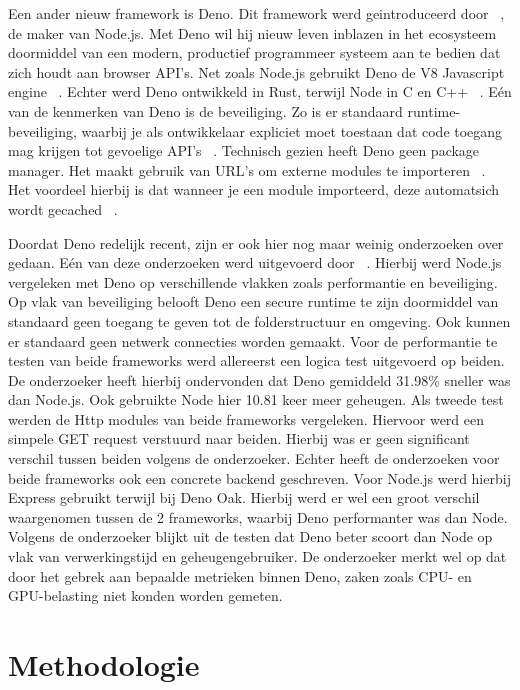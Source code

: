 Een ander nieuw framework is Deno. 
Dit framework werd geintroduceerd door ~\textcite{Dahl2021}, de maker van Node.js.
Met Deno wil hij nieuw leven inblazen in het ecosysteem doormiddel van een modern, productief programmeer systeem aan te bedien dat zich houdt aan browser API's.
Net zoals Node.js gebruikt Deno de V8 Javascript engine ~\autocite{DenoLand2023}. Echter werd Deno ontwikkeld in Rust, terwijl Node in C en C++ ~\autocite{DenoLand2023}. 
Eén van de kenmerken van Deno is de beveiliging. Zo is er standaard runtime-beveiliging, 
waarbij je als ontwikkelaar expliciet moet toestaan dat code toegang mag krijgen tot gevoelige API's ~\autocite{DenoLand2023}.
Technisch gezien heeft Deno geen package manager. Het maakt gebruik van URL's om externe modules te importeren ~\autocite{DenoLand2023}.
Het voordeel hierbij is dat wanneer je een module importeerd, deze automatsich wordt gecached ~\autocite{DenoLand2023}.

Doordat Deno redelijk recent, zijn er ook hier nog maar weinig onderzoeken over gedaan.
Eén van deze onderzoeken werd uitgevoerd door ~\textcite{VanKerkvoorde2021}. 
Hierbij werd Node.js vergeleken met Deno op verschillende vlakken zoals performantie en beveiliging.
Op vlak van beveiliging belooft Deno een secure runtime te zijn doormiddel van standaard geen toegang te geven tot de folderstructuur en omgeving. 
Ook kunnen er standaard geen netwerk connecties worden gemaakt. 
Voor de performantie te testen van beide frameworks werd allereerst een logica test uitgevoerd op beiden. 
De onderzoeker heeft hierbij ondervonden dat Deno gemiddeld 31.98\% sneller was dan Node.js. Ook gebruikte Node hier 10.81 keer meer geheugen.
Als tweede test werden de Http modules van beide frameworks vergeleken. Hiervoor werd een simpele GET request verstuurd naar beiden. 
Hierbij was er geen significant verschil tussen beiden volgens de onderzoeker.
Echter heeft de onderzoeken voor beide frameworks ook een concrete backend geschreven. Voor Node.js werd hierbij Express gebruikt terwijl bij Deno Oak.
Hierbij werd er wel een groot verschil waargenomen tussen de 2 frameworks, waarbij Deno performanter was dan Node.
Volgens de onderzoeker blijkt uit de testen dat Deno beter scoort dan Node op vlak van verwerkingstijd en geheugengebruiker.
De onderzoeker merkt wel op dat door het gebrek aan bepaalde metrieken binnen Deno, zaken zoals CPU- en GPU-belasting niet konden worden gemeten.
\section{Methodologie}%
\label{sec:methodologie}

